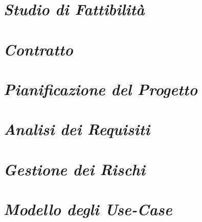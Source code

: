 \documentclass{article}
\begin{document}
\newpage
\section{\itshape{Studio di Fattibilità}}


\newpage
\section{\itshape{Contratto}}


\newpage
\section{\itshape{Pianificazione del Progetto}}


\newpage
\section{\itshape{Analisi dei Requisiti}}


\newpage
\section{\itshape{Gestione dei Rischi}}



\newpage
\section{\itshape{Modello degli Use-Case}}

\end{document}
